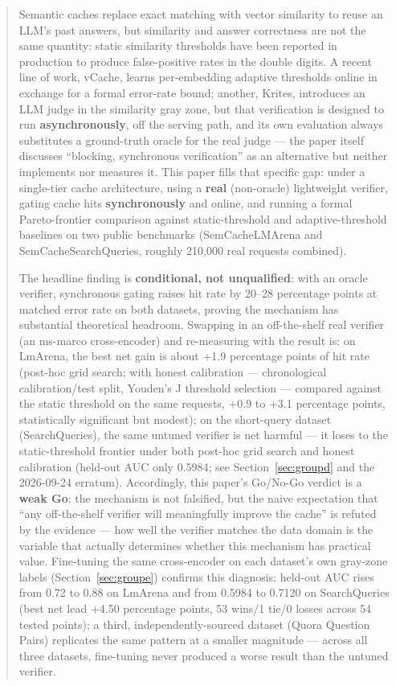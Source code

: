 \documentclass[11pt]{article}
\begin{document}
\begin{abstract}
\noindent
Semantic caches replace exact matching with vector similarity to reuse an LLM's past answers, but similarity and answer correctness are not the same quantity: static similarity thresholds have been reported in production to produce false-positive rates in the double digits. A recent line of work, vCache, learns per-embedding adaptive thresholds online in exchange for a formal error-rate bound; another, Krites, introduces an LLM judge in the similarity gray zone, but that verification is designed to run \textbf{asynchronously}, off the serving path, and its own evaluation always substitutes a ground-truth oracle for the real judge --- the paper itself discusses ``blocking, synchronous verification'' as an alternative but neither implements nor measures it. This paper fills that specific gap: under a single-tier cache architecture, using a \textbf{real} (non-oracle) lightweight verifier, gating cache hits \textbf{synchronously} and online, and running a formal Pareto-frontier comparison against static-threshold and adaptive-threshold baselines on two public benchmarks (SemCacheLMArena and SemCacheSearchQueries, roughly 210{,}000 real requests combined).

The headline finding is \textbf{conditional, not unqualified}: with an oracle verifier, synchronous gating raises hit rate by 20--28 percentage points at matched error rate on both datasets, proving the mechanism has substantial theoretical headroom. Swapping in an off-the-shelf real verifier (an ms-marco cross-encoder) and re-measuring with the result is: on LmArena, the best net gain is about +1.9 percentage points of hit rate (post-hoc grid search; with honest calibration --- chronological calibration/test split, Youden's J threshold selection --- compared against the static threshold on the same requests, +0.9 to +3.1 percentage points, statistically significant but modest); on the short-query dataset (SearchQueries), the same untuned verifier is net harmful --- it loses to the static-threshold frontier under both post-hoc grid search and honest calibration (held-out AUC only 0.5984; see Section~\ref{sec:groupd} and the 2026-09-24 erratum). Accordingly, this paper's Go/No-Go verdict is a \textbf{weak Go}: the mechanism is not falsified, but the naive expectation that ``any off-the-shelf verifier will meaningfully improve the cache'' is refuted by the evidence --- how well the verifier matches the data domain is the variable that actually determines whether this mechanism has practical value. Fine-tuning the same cross-encoder on each dataset's own gray-zone labels (Section~\ref{sec:groupe}) confirms this diagnosis: held-out AUC rises from 0.72 to 0.88 on LmArena and from 0.5984 to 0.7120 on SearchQueries (best net lead +4.50 percentage points, 53 wins/1 tie/0 losses across 54 tested points); a third, independently-sourced dataset (Quora Question Pairs) replicates the same pattern at a smaller magnitude --- across all three datasets, fine-tuning never produced a worse result than the untuned verifier.


\end{abstract}
\end{document}

